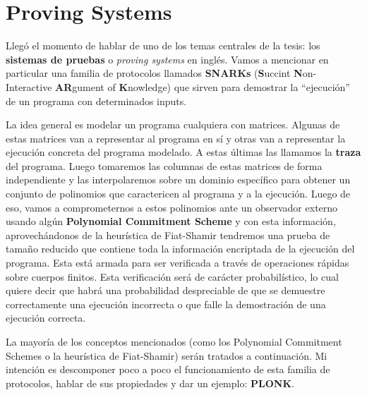 \chapter{Proving Systems}
Llegó el momento de hablar de uno de los temas centrales de la tesis: los \textbf{sistemas de pruebas} o \textit{proving systems} en inglés. Vamos a mencionar en particular una familia de protocolos llamados \textbf{SNARKs}\cite{bitansky2017hunting} (\textbf{S}uccint \textbf{N}on-Interactive \textbf{AR}gument of \textbf{K}nowledge) que sirven para demostrar la ``ejecución'' de un programa con determinados inputs.

La idea general es modelar un programa cualquiera con matrices. Algunas de estas matrices van a representar al programa en sí y otras van a representar la ejecución concreta del programa modelado. A estas últimas las llamamos la \textbf{traza} del programa. Luego tomaremos las columnas de estas matrices de forma independiente y las interpolaremos sobre un dominio específico para obtener un conjunto de polinomios que caractericen al programa y a la ejecución. Luego de eso, vamos a comprometernos a estos polinomios ante un observador externo usando algún \textbf{Polynomial Commitment Scheme} y con esta información, aprovechándonos de la heurística de Fiat-Shamir tendremos una prueba de tamaño reducido que contiene toda la información encriptada de la ejecución del programa. Esta está armada para ser verificada a través de operaciones rápidas sobre cuerpos finitos. Esta verificación será de carácter probabilístico, lo cual quiere decir que habrá una probabilidad despreciable de que se demuestre correctamente una ejecución incorrecta o que falle la demostración de una ejecución correcta.

La mayoría de los conceptos mencionados (como los Polynomial Commitment Schemes o la heurística de Fiat-Shamir) serán tratados a continuación. Mi intención es descomponer poco a poco el funcionamiento de esta familia de protocolos, hablar de sus propiedades y dar un ejemplo: \textbf{PLONK}. 

